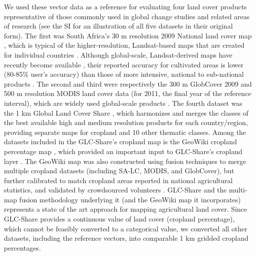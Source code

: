 \documentclass[12 pt, titlepage, a4paper]{article}
\begin{document}
We used these vector data as a reference for evaluating four land cover products representative of those commonly used in global change studies and related areas of research (see the SI for an illustration of all five datasets in their original form). The first was South Africa's 30 m resolution 2009 National land cover map \citep[SA-LC;][]{sanbi_national_2009}, which is typical of the higher-resolution, Landsat-based maps that are created for individual countries \citep[e.g.][]{fry_completion_2009}. Although global-scale, Landsat-derived maps have recently become available \citep{chen_global_2015}, their reported accuracy for cultivated areas is lower (80-85\% user's accuracy) than those of more intensive, national to sub-national products \citep[e.g. 90\% user's accuracy][]{sweeney_mapping_2015}. The second and third were respectively the 300 m GlobCover 2009 \citep{arino_global_2012} and 500 m resolution MODIS land cover \citep{friedl_modis_2010} data (for 2011, the final year of the reference interval), which are widely used global-scale products \citep[e.g.][]{gross_monitoring_2013, shackelford_conservation_2015}. The fourth dataset was the 1 km Global Land Cover Share \citep[GLC-Share;][]{latham_global_2014}, which harmonizes and merges the classes of the best available high and medium resolution products for each country/region, providing separate maps for cropland and 10 other thematic classes. Among the datasets included in the GLC-Share's cropland map is the GeoWiki cropland percentage map \citep{waldner_unified_2016, fritz_mapping_2015}, which provided an important input to GLC-Share's cropland layer \citep{latham_global_2014}. The GeoWiki map was also constructed using fusion techniques to merge multiple cropland datasets (including SA-LC, MODIS, and GlobCover), but further calibrated to match cropland areas reported in national agricultural statistics, and validated by crowdsourced volunteers \citep{fritz_mapping_2015}. GLC-Share and the multi-map fusion methodology underlying it (and the GeoWiki map it incorporates) represents a state of the art approach for mapping agricultural land cover. Since GLC-Share provides a continuous value of land cover (cropland percentage), which cannot be feasibly converted to a categorical value, we converted all other datasets, including the reference vectors, into comparable 1 km gridded cropland percentages. 

\end{document}
